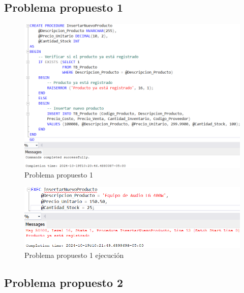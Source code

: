 \subsection{Problema propuesto 1}

\begin{figure}[H]
  \centering
  \includegraphics[scale = 0.5]{Imagenes/probs_propuestos/pp1.png}
  \caption{Problema propuesto 1}
\end{figure}

\begin{figure}[H]
  \centering
  \includegraphics[scale = 0.5]{Imagenes/probs_propuestos/pp1_exe.png}
  \caption{Problema propuesto 1 ejecución}
\end{figure}

\subsection{Problema propuesto 2}

